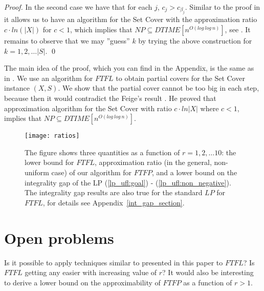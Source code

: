 \documentclass{llncs}
\begin{document}
\begin{proof}
 In the second case we have that for each $j$, $c_j > c_{\beta_j}$. Similar to the proof in \cite{Guha} it allows us to have an algorithm for the Set Cover with the approximation ratio $c\cdot ln(|X|)$ for $c < 1$, which implies that $NP \subseteq DTIME[n^{O(log~log~n)}]$, see \cite{Feige}. It remains to observe that we may ''guess'' $k$ by trying the above construction for $k = 1, 2, \dots |S|$.
 \qed
\end{proof}

The main idea of the proof, which you can find in the Appendix, is the same as in \cite{Guha}. We use an algorithm for $FTFL$ to obtain partial covers for the Set Cover instance $(X, S)$. We show that the partial cover cannot be too big in each step, because then it would contradict the Feige’s result \cite{Feige}. He proved that approximation algorithm for the Set Cover with ratio $c \cdot ln |X|$ where $c < 1$, implies that $NP \subseteq DTIME[n^{O(log~log~n)}]$.

\begin{figure}
  \centering
  \texttt{[image: ratios]}
 \caption{The figure shows three quantities as a function of $r = 1, 2, \dots 10$: the lower bound for $FTFL$, approximation ratio (in the general, non-uniform case) of our algorithm for $FTFP$, and a lower bound on the integrality gap of the LP (\ref{lp_ufl:goal}) - (\ref{lp_ufl:non_negative}). The integrality gap results are also true for the  standard $LP$ for $FTFL$, for details see Appendix~\ref{int_gap_section}.}
  \label{fig:apx_plot}
\end{figure}

\section{Open problems}
Is it possible to apply techniques similar to presented in this paper to $FTFL$? Is $FTFL$ getting any easier with increasing value of $r$? It would also be interesting to derive a lower bound on the approximability of $FTFP$ as a function of $r > 1$.
\end{document}
